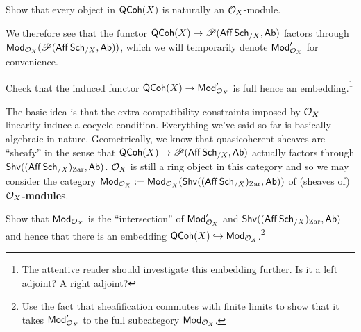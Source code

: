 \documentclass[11pt]{article}
\begin{document}
\begin{exercise}
Show that every object in $\QCoh(X)$ is naturally an $\O_X$-module.
\end{exercise}

We therefore see that the functor $\QCoh(X)\to\Pre(\Aff\Sch_{/X},\Ab)$ factors through $\Mod_{\O_X}(\Pre(\Aff\Sch_{/X},\Ab))$, which we will temporarily denote $\Mod'_{\O_X}$ for convenience. 

\begin{exercise}
Check that the induced functor $\QCoh(X)\to\Mod'_{\O_X}$ is full hence an embedding.\footnote{The attentive reader should investigate this embedding further. Is it a left adjoint? A right adjoint?}
\end{exercise}

The basic idea is that the extra compatibility constraints imposed by $\O_X$-linearity induce a cocycle condition. Everything we've said so far is basically algebraic in nature. Geometrically, we know that quasicoherent sheaves are ``sheafy'' in the sense that $\QCoh(X)\to\Pre(\Aff\Sch_{/X},\Ab)$ actually factors through $\Shv((\Aff\Sch_{/X})_{\Zar},\Ab)$. $\O_X$ is still a ring object in this category and so we may consider the category $\Mod_{\O_X}:=\Mod_{\O_X}(\Shv((\Aff\Sch_{/X})_{\Zar},\Ab))$ of (sheaves of) \textbf{$\O_X$-modules}.

\begin{exercise}
Show that $\Mod_{\O_X}$ is the ``intersection'' of $\Mod'_{\O_X}$ and $\Shv((\Aff\Sch_{/X})_{\Zar},\Ab)$ and hence that there is an embedding $\QCoh(X)\inj\Mod_{\O_X}$.\footnote{Use the fact that sheafification commutes with finite limits to show that it takes $\Mod'_{\O_X}$ to the full subcategory $\Mod_{\O_X}$.}
\end{exercise}
\end{document}
